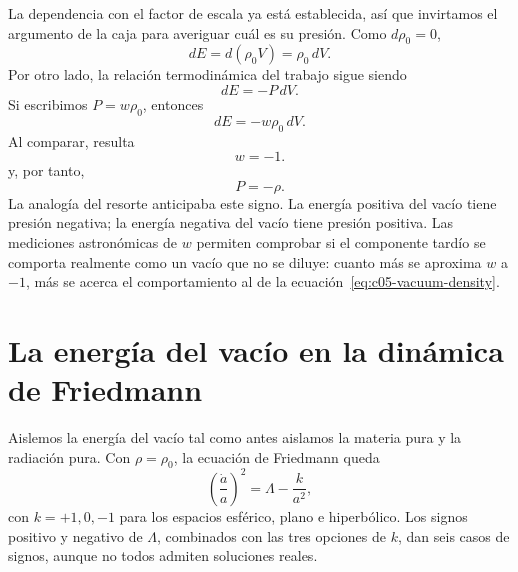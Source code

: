 La dependencia con el factor de escala ya está establecida, así que invirtamos el argumento de la caja para averiguar cuál es su presión. Como \(d\rho_0=0\),
\begin{equation}
dE=d(\rho_0V)=\rho_0\,dV.
\end{equation}
Por otro lado, la relación termodinámica del trabajo sigue siendo
\begin{equation}
dE=-P\,dV.
\end{equation}
Si escribimos \(P=w\rho_0\), entonces
\begin{equation}
dE=-w\rho_0\,dV.
\end{equation}
Al comparar, resulta
\begin{equation}
w=-1.
\end{equation}
y, por tanto,
\begin{equation}
P=-\rho.
\end{equation}
La analogía del resorte anticipaba este signo. La energía positiva del vacío tiene presión negativa; la energía negativa del vacío tiene presión positiva. Las mediciones astronómicas de \(w\) permiten comprobar si el componente tardío se comporta realmente como un vacío que no se diluye: cuanto más se aproxima \(w\) a \(-1\), más se acerca el comportamiento al de la ecuación~\eqref{eq:c05-vacuum-density}.

\begin{classroomqa}
\end{classroomqa}

\section{La energía del vacío en la dinámica de Friedmann}

Aislemos la energía del vacío tal como antes aislamos la materia pura y la radiación pura. Con \(\rho=\rho_0\), la ecuación de Friedmann queda
\begin{equation}
\left(\frac{\dot a}{a}\right)^2=\Lambda-\frac{k}{a^2},
\label{eq:c05-vacuum-friedmann}
\end{equation}
con \(k=+1,0,-1\) para los espacios esférico, plano e hiperbólico. Los signos positivo y negativo de \(\Lambda\), combinados con las tres opciones de \(k\), dan seis casos de signos, aunque no todos admiten soluciones reales.

